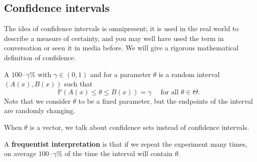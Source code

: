\documentclass[a4paper]{scrartcl}
\begin{document}
\subsection{Confidence intervals}
The idea of confidence intervals is omnipresent; it is used in the real world to describe a measure of certainty, and you may well have used the term in conversation or seen it in media before. We will give a rigorous mathematical definition of confidence.
\begin{definition*}
      A $100 \cdot \gamma$\%  with $\gamma \in (0,1)$ and for a parameter $\theta$ is a random interval $(A (x),B (x))$ such that \[
      \mathbb{P}(A (x) \leq \theta \leq B (x)) = \gamma \quad \text{ for all } \theta \in \Theta
      .\] Note that we consider $\theta$ to be a fixed parameter, but the endpoints of the interval are randomly changing.
\end{definition*}
\begin{remark}
     When $\theta$ is a vector, we talk about confidence sets instead of confidence intervals.
\end{remark}
A \textbf{frequentist interpretation} is that if we repeat the experiment many times, on average $100 \cdot \gamma \%$ of the time the interval will contain $\theta$. 
\end{document}
